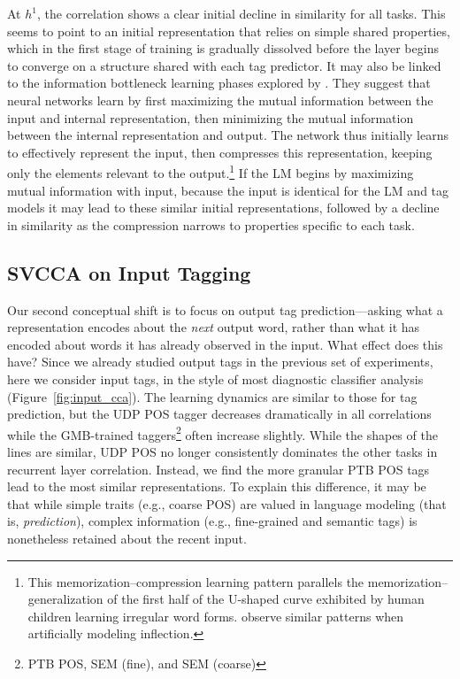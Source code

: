 At $h^1$, the correlation shows a clear initial decline in similarity for all tasks. This seems to point to an initial representation that relies on simple shared properties, which in the first stage of training is gradually dissolved before the layer begins to converge on a structure shared with each tag predictor. It may also be linked to the information bottleneck learning phases explored by  \citeauthor{shwartz-ziv_opening_2017}. They suggest that neural networks learn by first maximizing the mutual information between the input and internal representation, then minimizing the mutual information between the internal representation and output. The network thus initially learns to effectively represent the input, then compresses this representation, keeping only the elements relevant to the output.\footnote{This memorization–compression learning pattern parallels the memorization–generalization  of the first half of the U-shaped curve exhibited by  human children learning irregular word forms. \citeauthor{kirov_recurrent_2018} observe similar patterns when artificially modeling inflection.} If the LM begins by maximizing mutual information with input, because the input is identical for the LM and tag models it may lead to these similar initial representations, followed by a decline in similarity as the compression narrows to properties specific to each task.


\subsection{SVCCA on Input Tagging}

Our second conceptual shift is to focus on output tag prediction---asking what a representation encodes about the \emph{next} output word, rather than what it has encoded about words it has already observed in the input. What effect does this have? Since we already studied output tags in the previous set of experiments, here we consider input tags, in the style of most diagnostic classifier analysis (Figure~\ref{fig:input_cca}). The learning dynamics are similar to those for tag prediction, but the UDP POS tagger decreases dramatically in all correlations while the GMB-trained taggers\footnote{PTB POS, SEM (fine), and SEM (coarse)} often increase slightly. While the shapes of the lines are similar, UDP POS no longer consistently dominates the other tasks in recurrent layer correlation. Instead, we find the more granular PTB POS tags lead to the most similar representations. To explain this difference, it may be that while simple traits (e.g., coarse POS) are valued in language modeling (that is, \textit{prediction}), complex information (e.g., fine-grained and semantic tags) is nonetheless retained about the recent input.


